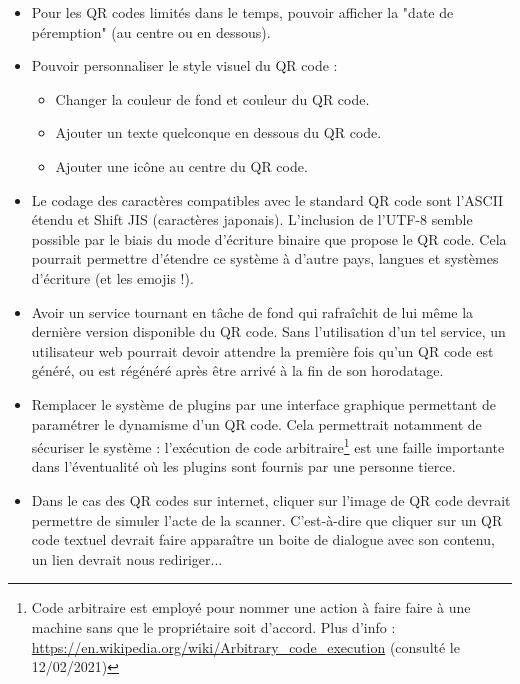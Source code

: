 \documentclass[a4paper,12pt]{article}
\begin{document}
\begin{itemize}

    \item Pour les QR codes limités dans le temps, pouvoir afficher la "date de péremption" (au centre ou en dessous).\\
    
    \item Pouvoir personnaliser le style visuel du QR code :
    \begin{itemize}
        \item Changer la couleur de fond et couleur du QR code.
        \item Ajouter un texte quelconque en dessous du QR code.
        \item Ajouter une icône au centre du QR code.\\
    \end{itemize}
    
    \item Le codage des caractères compatibles avec le standard QR code sont l'ASCII étendu et Shift JIS (caractères japonais). L'inclusion de l'UTF-8 semble possible par le biais du mode d'écriture binaire que propose le QR code. Cela pourrait permettre d'étendre ce système à d'autre pays, langues et systèmes d'écriture (et les emojis !).\\
    
    \item Avoir un service tournant en tâche de fond qui rafraîchit de lui même la dernière version disponible du QR code. Sans l'utilisation d'un tel service, un utilisateur web pourrait devoir attendre la première fois qu'un QR code est généré, ou est régénéré après être arrivé à la fin de son horodatage.\\
    
    \item Remplacer le système de plugins par une interface graphique permettant de paramétrer le dynamisme d'un QR code. Cela permettrait notamment de sécuriser le système : l'exécution de code arbitraire\footnote{Code arbitraire est employé pour nommer une action à faire faire à une machine sans que le propriétaire soit d'accord. Plus d'info : \url{https://en.wikipedia.org/wiki/Arbitrary\_code\_execution} (consulté le 12/02/2021)} est une faille importante dans l'éventualité où les plugins sont fournis par une personne tierce.\\
    
    \item Dans le cas des QR codes sur internet, cliquer sur l'image de QR code devrait permettre de simuler l'acte de la scanner. C'est-à-dire que cliquer sur un QR code textuel devrait faire apparaître un boite de dialogue avec son contenu, un lien devrait nous rediriger...\\
    

\end{itemize}
\end{document}
